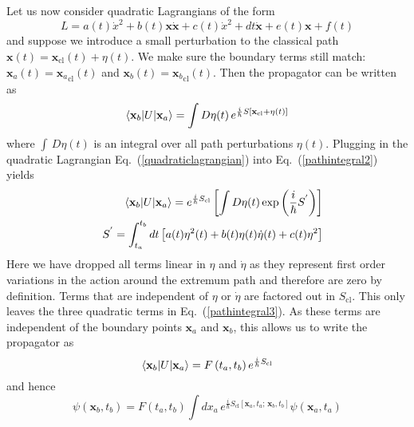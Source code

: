 \vspace{5mm}

Let us now consider quadratic Lagrangians of the form
\begin{equation}
L=a(t)\dot{x}^2+b(t)\mathbf{x}\dot{\mathbf{x}}+c(t)\dot{x}^2+d{t}\dot{\mathbf{x}}+e(t)\mathbf{x}+f(t)
\label{quadraticlagrangian}
\end{equation}
and suppose we introduce a small perturbation to the classical path $\mathbf{x}(t)=\mathbf{x}_{\mathrm{cl}}(t)+\eta(t)$.  We make sure the boundary terms still match: $\mathbf{x}_a(t)={\mathbf{x}_a}_{\mathrm{cl}}(t)$ and $\mathbf{x}_b(t)={\mathbf{x}_b}_{\mathrm{cl}}(t)$.  Then the propagator can be written as
\begin{equation}
\braket{\mathbf{x}_b|U|\mathbf{x}_a}=\int D\eta(t)\,e^{\frac{i}{\hbar}S\left[\mathbf{x}_{\mathrm{cl}}+\eta(t)\right]}
\label{pathintegral2}
\end{equation}
where $\int\,D\eta(t)$ is an integral over all path perturbations $\eta(t)$.  Plugging in the quadratic Lagrangian Eq.\ (\ref{quadraticlagrangian}) into Eq.\ (\ref{pathintegral2}) yields 
\begin{eqnarray}
&&\braket{\mathbf{x}_b|U|\mathbf{x}_a}=e^{\frac{i}{\hbar}S_{\mathrm{cl}}}\left[\int D\eta(t)\exp{\left(\frac{i}{\hbar}S^{'}\right)}\right] \nonumber \\
&&S^{'}=\int^{t_b}_{t_a}dt\left[a(t)\eta^2(t)+b(t)\eta(t)\dot{\eta}(t)+c(t)\eta^2\right]
\label{pathintegral3}
\end{eqnarray}
Here we have dropped all terms linear in $\eta$ and $\dot{\eta}$ as they represent first order variations in the action around the extremum path and therefore are zero by definition. Terms that are independent of $\eta$ or $\dot{\eta}$ are factored out in $S_{\mathrm{cl}}$.  This only leaves the three quadratic terms in  Eq.\ (\ref{pathintegral3}).  As these terms are independent of the boundary points $\mathbf{x}_a$ and $\mathbf{x}_b$, this allows us to write the propagator as
\begin{equation}
\braket{\mathbf{x}_b|U|\mathbf{x}_a}=F\left(t_a,t_b\right)e^{\frac{i}{\hbar}S_{\mathrm{cl}}}
\label{pathintegral4}
\end{equation}
and hence 
\begin{equation}
\psi\left(\mathbf{x}_b,t_b\right)=F\left(t_a,t_b\right)\int dx_a\,e^{\frac{i}{\hbar}S_{\mathrm{cl}}\left[\mathbf{x}_a,t_a;\,\mathbf{x}_b,t_b\right]}\psi\left(\mathbf{x}_a,t_a\right)
\end{equation}

